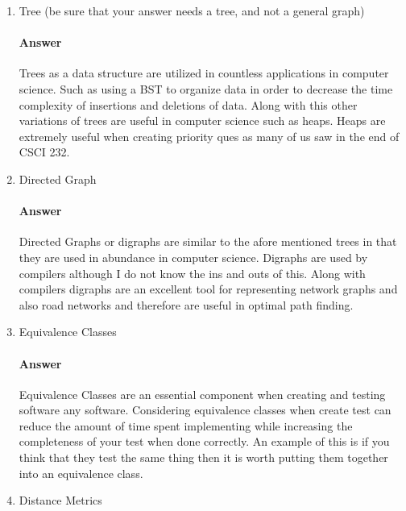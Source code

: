 \documentclass{article}
\begin{document}
\begin{enumerate}

    \item Tree (be sure that your answer needs a tree, and not a general graph)

        \paragraph{Answer}

        Trees as a data structure are utilized in countless applications in computer
        science. Such as using a BST to organize data in order to decrease the time
        complexity of insertions and deletions of data. Along with this other variations
        of trees are useful in computer science such as heaps. Heaps are extremely useful
        when creating priority ques as many of us saw in the end of CSCI 232.

    \item Directed Graph

        \paragraph{Answer}

        Directed Graphs or digraphs are similar to the afore mentioned trees in that they are used
        in abundance in computer science. Digraphs are used by compilers although I do not know the ins and outs of this.
        Along with compilers digraphs are an excellent tool for representing network graphs
        and also road networks and therefore are useful in optimal path finding.

    \item Equivalence Classes

        \paragraph{Answer}

        Equivalence Classes are an essential component when creating and testing software
        any software. Considering equivalence classes when create test can reduce the amount of
        time spent implementing while increasing the completeness of your test when done
        correctly. An example of this is if you think that they test the same thing then it is worth
        putting them together into an equivalence class.

    \item Distance Metrics


\end{enumerate}
\end{document}
